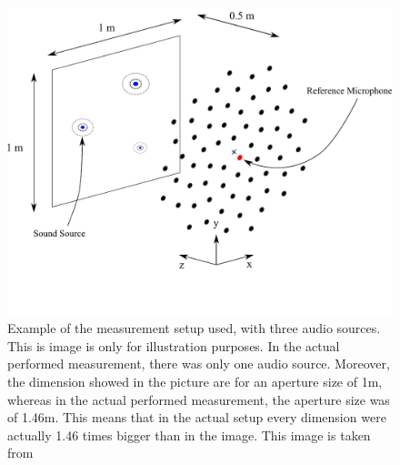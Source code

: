 \documentclass[11pt,a4paper,twoside]{report}
\begin{document}
\begin{figure}
    \centering
    \includegraphics[width=1\textwidth]{figs/full_measurement_setup.pdf}
    \caption{Example of the measurement setup used, with three audio sources. This is image is only for illustration purposes. In the actual performed measurement, there was only one audio source. Moreover, the dimension showed in the picture are for an aperture size of 1m, whereas in the actual performed measurement, the aperture size was of 1.46m. This means that in the actual setup every dimension were actually 1.46 times bigger than in the image. This image is taken from \cite{kujawski2022acoupipe}}
    \label{fig:full_measurement_setup}
\end{figure} 
\end{document}
